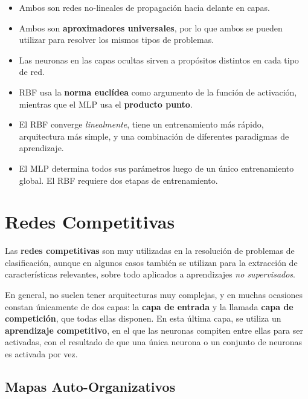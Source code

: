 \documentclass[10pt,a4paper]{article}
\begin{document}
\begin{multicols}{2}
\begin{itemize}
\item Ambos son redes no-lineales de propagación hacia delante en capas.
\item Ambos son \textbf{aproximadores universales}, por lo que ambos se pueden utilizar para resolver los mismos tipos de problemas.
\item Las neuronas en las capas ocultas sirven a propósitos distintos en cada tipo de red.
\item RBF usa la \textbf{norma euclídea} como argumento de la función de activación, mientras que el MLP usa el \textbf{producto punto}.
\item El RBF converge \textit{linealmente}, tiene un entrenamiento más rápido, arquitectura más simple, y una combinación de diferentes paradigmas de aprendizaje.
\item El MLP determina todos sus parámetros luego de un único entrenamiento global. El RBF requiere dos etapas de entrenamiento.
\end{itemize}
\end{multicols}


\section{Redes Competitivas}

Las \textbf{redes competitivas} son muy utilizadas en la resolución de problemas de clasificación, aunque en algunos casos también se utilizan para la extracción de características relevantes, sobre todo aplicados a aprendizajes \textit{no supervisados}.

En general, no suelen tener arquitecturas muy complejas, y en muchas ocasiones constan únicamente de dos capas: la \textbf{capa de entrada} y la llamada \textbf{capa de competición}, que todas ellas disponen. En esta última capa, se utiliza un \textbf{aprendizaje competitivo}, en el que las neuronas compiten entre ellas para ser activadas, con el resultado de que una única neurona o un conjunto de neuronas es activada por vez.

\subsection{Mapas Auto-Organizativos}
\end{document}
